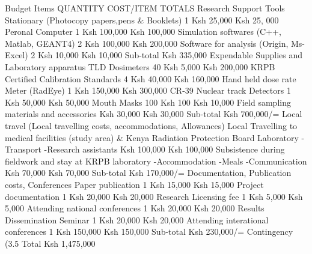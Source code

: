 Budget Items	QUANTITY	COST/ITEM	TOTALS
Research Support Tools			
Stationary (Photocopy papers,pens & Booklets)	1	Ksh   25,000	Ksh 25, 000
Peronal Computer	1	Ksh 100,000	Ksh 100,000
Simulation softwares (C++, Matlab, GEANT4)	2	Ksh 100,000	Ksh 200,000
Software for analysis (Origin, Ms-Excel)	2	Ksh   10,000	Ksh   10,000
	Sub-total		Ksh  335,000
Expendable Supplies and Laboratory apparatus			
TLD Dosimeters	40	Ksh     5,000	Ksh 200,000
KRPB Certified Calibration Standards	4	Ksh   40,000	Ksh 160,000
Hand held dose rate Meter (RadEye)	1	Ksh 150,000	Ksh 300,000
CR-39 Nuclear track Detectors	1	Ksh   50,000	Ksh   50,000
Mouth Masks	100	Ksh        100	Ksh   10,000
Field sampling materials and accessories		Ksh   30,000	Ksh   30,000
	Sub-total		Ksh 700,000/=
Local travel (Local travelling costs, accommodations, Allowances)
Local Travelling to medical facilities (study area) & Kenya Radiation Protection Board Laboratory	-Transport
-Research assistants	Ksh 100,000	Ksh 100,000
Subsistence during fieldwork and stay at KRPB laboratory	-Accommodation -Meals 
-Communication	Ksh   70,000	Ksh 70,000
	Sub-total		Ksh 170,000/=
Documentation, Publication costs, Conferences			
Paper publication	1	Ksh   15,000	Ksh       15,000
Project  documentation	1	Ksh   20,000	Ksh       20,000
Research Licensing fee	1	Ksh     5,000	Ksh         5,000
Attending national conferences	1	Ksh   20,000	Ksh       20,000
Results Dissemination Seminar	1	Ksh   20,000	Ksh       20,000
Attending interational conferences	1	Ksh   150,000	Ksh     150,000
	Sub-total 		Ksh 230,000/=
Contingency (3.5%
Total 			Ksh 1,475,000
